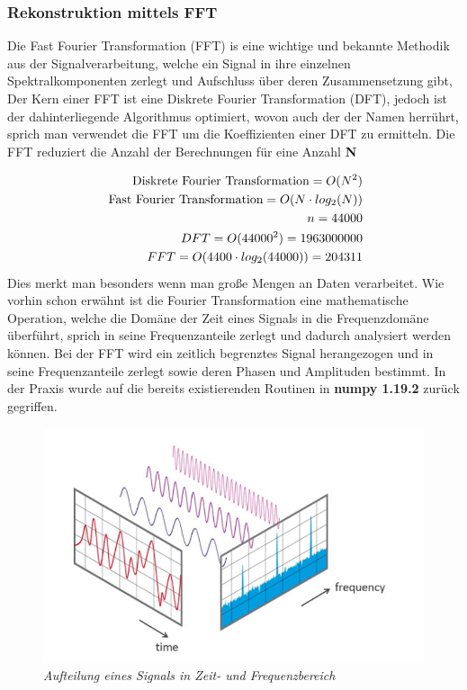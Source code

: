 \documentclass[11pt]{report}
\begin{document}
\subsubsection{Rekonstruktion mittels FFT}
Die Fast Fourier Transformation (FFT) is eine wichtige und bekannte Methodik aus der Signalverarbeitung, welche ein Signal in ihre einzelnen Spektralkomponenten zerlegt und Aufschluss über deren Zusammensetzung gibt, Der Kern einer FFT ist eine Diskrete Fourier Transformation (DFT), jedoch ist der dahinterliegende Algorithmus optimiert, wovon auch der der Namen herrührt, sprich man verwendet die FFT um die Koeffizienten einer DFT zu ermitteln. Die FFT reduziert die Anzahl der Berechnungen für eine Anzahl \textbf{N}

\begin{equation}
\begin{split}
\textnormal{Diskrete Fourier Transformation} = O(N^{2}) \\\
\textnormal{Fast Fourier Transformation} = O(N\cdot log_2(N)) \\\
n = 44000\\\
DFT = O(44000^2) = 1 963 000 000 \\\
FFT = O(4400\cdot log_2(44000)) = 204311
\end{split}
\end{equation}
Dies merkt man besonders wenn man große Mengen an Daten verarbeitet. Wie vorhin schon erwähnt ist die Fourier Transformation eine mathematische Operation, welche die Domäne der Zeit eines Signals in die Frequenzdomäne überführt, sprich in seine Frequenzanteile zerlegt und dadurch analysiert werden können. Bei der FFT wird ein zeitlich begrenztes Signal herangezogen und in seine Frequenzanteile zerlegt sowie deren Phasen und Amplituden bestimmt. In der Praxis wurde auf die bereits existierenden Routinen in \textbf{numpy 1.19.2} zurück gegriffen.
\begin{figure}[H]
\centering
\includegraphics[scale=0.6]{./Grafiken/Fitting/FFT/FFT_time_und_frequenz_anteile.jpg}
\caption{\textit{Aufteilung eines Signals in Zeit- und Frequenzbereich}}
\end{figure}
\end{document}
